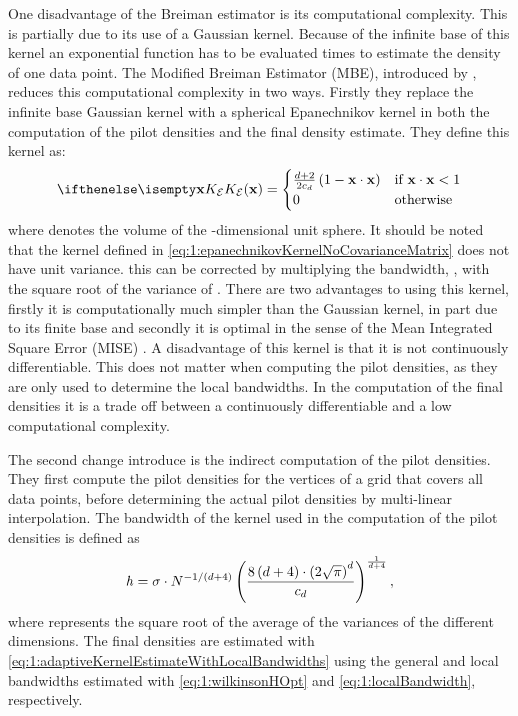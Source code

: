 	One disadvantage of the Breiman estimator is its computational complexity. This is partially due to its use of a Gaussian kernel. Because of the infinite base of this kernel an exponential function has to be evaluated \varNumPatterns times to estimate the density of one data point. 
	The Modified Breiman Estimator (MBE), introduced by \textcite{wilkinson1995dataplot}, reduces this computational complexity in two ways. Firstly they replace the infinite base Gaussian kernel with a spherical Epanechnikov kernel in both the computation of the pilot densities and the final density estimate. They define this kernel as:
	\begin{equation}\label{eq:1:epanechnikovKernelNoCovarianceMatrix}
		\varKernel[\varEpan]{\varPattern} = 
		\begin{cases}
			\frac{\varDim + 2}{2\varUnitSphere{\varDim}} \left( 1 - \varPattern \cdot \varPattern \right) & \text{if } \varPattern \cdot \varPattern < 1\\
			0 & \text{otherwise}
		\end{cases}
	\end{equation}
	 where \varUnitSphere{\varDim} denotes the volume of the \varDim-dimensional unit sphere. It should be noted that the kernel defined in \cref{eq:1:epanechnikovKernelNoCovarianceMatrix} does not have unit variance. this can be corrected by multiplying the bandwidth, \varBandwidth,  with the square root of the variance of \varKernel[\varEpan]{}. There are two advantages to using this kernel, firstly it is computationally much simpler than the Gaussian kernel, in part due to its finite base and secondly it is optimal in the sense of the Mean Integrated Square Error (MISE) \cite{epanechnikov1969non}. A disadvantage of this kernel is that it is not continuously differentiable. This does not matter when computing the pilot densities, as they are only used to determine the local bandwidths. In the computation of the final densities it is a trade off between a continuously differentiable \varEstimatedDensityFunction{} and a low computational complexity.

	The second change \textcite{wilkinson1995dataplot} introduce is the indirect computation of the pilot densities. They first compute the pilot densities for the vertices of a grid that covers all data points, before determining the actual pilot densities by multi-linear interpolation.
	The bandwidth of the kernel used in the computation of the pilot densities is defined as
		\begin{equation}\label{eq:1:wilkinsonHOpt}
			\mathit{h} = 
			\sigma \cdot N^{{-1}/{\left(d +  4\right)}}
			\left(\frac{8\left(d + 4\right) \cdot \left(2 \sqrt{\pi}\right)^d}{c_{d}}\right)^{\frac{1}{d + 4}},
		\end{equation}
	where \varWilkinsonConstant represents the square root of the average of the variances of the different dimensions. The final densities are estimated with \cref{eq:1:adaptiveKernelEstimateWithLocalBandwidths} using the general and local bandwidths estimated with \cref{eq:1:wilkinsonHOpt} and \eqref{eq:1:localBandwidth}, respectively. 

